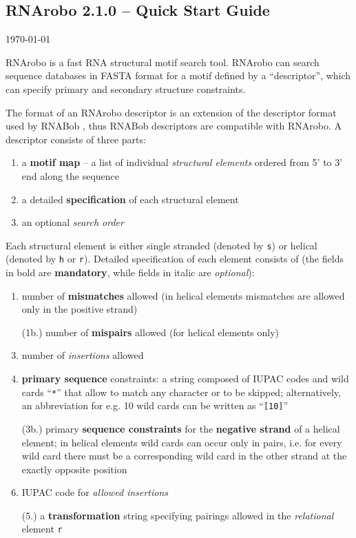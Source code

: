 \documentclass[11pt]{article}
\begin{document}


\begin{center}
\section*{RNArobo 2.1.0 -- Quick Start Guide}
\today
\end{center}

RNArobo is a fast RNA structural motif search tool. RNArobo can search sequence databases in FASTA format for a motif defined by a ``descriptor'', which can specify primary and secondary structure constraints.

The format of an RNArobo descriptor is an extension of the descriptor format used by RNABob \cite{eddy1996}, thus RNABob descriptors are compatible with RNArobo. A descriptor consists of three parts:
\begin{enumerate}
\item a \textbf{motif map} -- a list of individual \emph{structural elements}
  ordered from 5' to 3' end along the sequence
\item a detailed \textbf{specification} of each structural element
\item an optional \emph{search order}
\end{enumerate}
Each structural element is either single stranded (denoted by \texttt{s}) or helical (denoted by \texttt{h} or \texttt{r}). Detailed specification of each element consists of (the fields in bold are \textbf{mandatory}, while fields in italic are \emph{optional}):
\begin{enumerate}
\item number of \textbf{mismatches} allowed (in helical elements mismatches are allowed only in the positive strand)
\item[(1b.)] number of \textbf{mispairs} allowed (for helical elements only)
\item number of \emph{insertions} allowed
\item \textbf{primary sequence} constraints: a string composed of IUPAC codes and wild cards ``\texttt{*}'' that allow to match any character or to be skipped; alternatively, an abbreviation for e.g. 10 wild cards can be written as ``\texttt{[10]}''
\item[(3b.)] primary \textbf{sequence constraints} for the \textbf{negative strand} of a helical element; in helical elements wild cards can occur only in pairs, i.e. for every wild card there must be a corresponding wild card in the other strand at the exactly opposite position
\item IUPAC code for \emph{allowed insertions}
\item[(5.)] a \textbf{transformation} string specifying pairings allowed in the \emph{relational} element \texttt{r} 
\end{enumerate}
\end{document}
